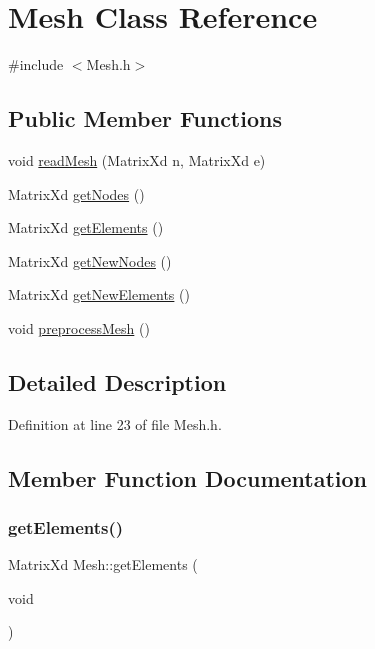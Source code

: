 \hypertarget{class_mesh}{}\section{Mesh Class Reference}
\label{class_mesh}


{\ttfamily \#include $<$Mesh.\+h$>$}

\subsection*{Public Member Functions}
\begin{DoxyCompactItemize}
\item 
void \hyperlink{class_mesh_a2e0931c78a7ef01ccc9bf8f0dd74afb0}{read\+Mesh} (Matrix\+Xd n, Matrix\+Xd e)
\item 
Matrix\+Xd \hyperlink{class_mesh_a0b0f7458f07745240d9bda967cda12de}{get\+Nodes} ()
\item 
Matrix\+Xd \hyperlink{class_mesh_af3cbe568c8a36832659ac01025e8d774}{get\+Elements} ()
\item 
Matrix\+Xd \hyperlink{class_mesh_a52ecce406bbef80cbf3610db3ea5ea40}{get\+New\+Nodes} ()
\item 
Matrix\+Xd \hyperlink{class_mesh_af242dbb4627c09410975a0e67389e0de}{get\+New\+Elements} ()
\item 
void \hyperlink{class_mesh_aa8a6f260e9589be4c0a2fcc146e696d5}{preprocess\+Mesh} ()
\end{DoxyCompactItemize}


\subsection{Detailed Description}


Definition at line 23 of file Mesh.\+h.



\subsection{Member Function Documentation}
\mbox{\label{class_mesh_af3cbe568c8a36832659ac01025e8d774}} 
\subsubsection{\texorpdfstring{get\+Elements()}{getElements()}}
{\footnotesize\ttfamily Matrix\+Xd Mesh\+::get\+Elements (\begin{DoxyParamCaption}\item[{void}]{ }\end{DoxyParamCaption})}



